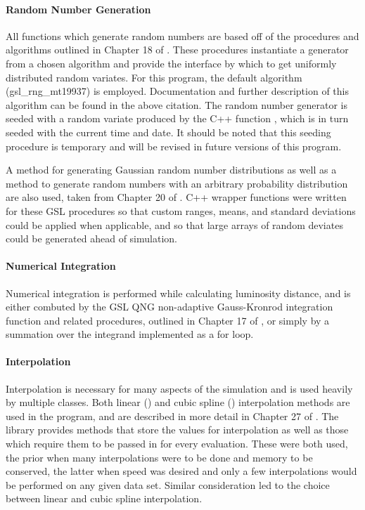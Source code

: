 \documentclass[twocolumn,letterpaper,10pt]{article}
\begin{document}
\paragraph{Random Number Generation}

All functions which generate random numbers are based off of the procedures and algorithms outlined in Chapter 18 of \citet{GSL}. These procedures instantiate a generator from a chosen algorithm and provide the interface by which to get uniformly distributed random variates. For this program, the default algorithm ({\sc gsl\_rng\_mt19937}) is employed. Documentation and further description of this algorithm can be found in the above citation. The random number generator is seeded with a random variate produced by the C++ function {}, which is in turn seeded with the current time and date. It should be noted that this seeding procedure is temporary and will be revised in future versions of this program. 

A method for generating Gaussian random number distributions as well as a method to generate random numbers with an arbitrary probability distribution are also used, taken from Chapter 20 of \citet{GSL}.  C++ wrapper functions were written for these GSL procedures so that custom ranges, means, and standard deviations could be applied when applicable, and so that large arrays of random deviates could be generated ahead of simulation.

\paragraph{Numerical Integration}

Numerical integration is performed while calculating luminosity distance, and is either combuted by the GSL QNG non-adaptive Gauss-Kronrod integration function and related procedures, outlined in Chapter 17 of \citet{GSL}, or simply by a summation over the integrand implemented as a for loop.

\paragraph{Interpolation}

Interpolation is necessary for many aspects of the simulation and is used heavily by multiple classes. Both linear ({}) and cubic spline ({}) interpolation methods are used in the program, and are described in more detail in Chapter 27 of \citet{GSL}. The library provides methods that store the values for interpolation as well as those which require them to be passed in for every evaluation. These were both used, the prior when many interpolations were to be done and memory to be conserved, the latter when speed was desired and only a few interpolations would be performed on any given data set. Similar consideration led to the choice between linear and cubic spline interpolation.
\end{document}
